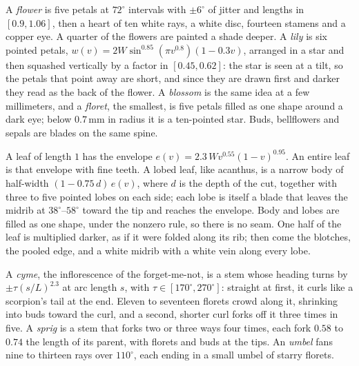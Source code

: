 \begin{construction}[Flowers]
  A \emph{flower} is five petals at $72^\circ$ intervals with
  $\pm6^\circ$ of jitter and lengths
  in $[0.9,1.06]$, then a heart of ten white rays, a white disc,
  fourteen stamens and a copper
  eye. A quarter of the flowers are painted a shade deeper. A
  \emph{lily} is six pointed
  petals, $w(v)=2W\sin^{0.85}(\pi v^{0.8})(1-0.3v)$, arranged in a
  star and then squashed
  vertically by a factor in $[0.45,0.62]$: the star is seen at a
  tilt, so the petals that point
  away are short, and since they are drawn first and darker they read
  as the back of the
  flower. A \emph{blossom} is the same idea at a few millimeters, and
  a \emph{floret}, the
  smallest, is five petals filled as one shape around a dark eye;
  below $0.7\,$mm in radius it is a
  ten-pointed star. Buds, bellflowers and sepals are blades on the same spine.
\end{construction}

\begin{construction}[Leaves]
  A leaf of length $1$ has the envelope $e(v)=2.3\,W
  v^{0.55}(1-v)^{0.95}$. An entire leaf is
  that envelope with fine teeth. A lobed leaf, like acanthus, is a
  narrow body of half-width
  $(1-0.75\,d)\,e(v)$, where $d$ is the depth of the cut, together
  with three to five pointed
  lobes on each side; each lobe is itself a blade that leaves the midrib at
  $38^\circ$--$58^\circ$ toward the tip and reaches the envelope.
  Body and lobes are filled as
  one shape, under the nonzero rule, so there is no seam. One half of
  the leaf is multiplied
  darker, as if it were folded along its rib; then come the blotches,
  the pooled edge, and a
  white midrib with a white vein along every lobe.
\end{construction}

\begin{construction}[Sprays]
  A \emph{cyme}, the inflorescence of the forget-me-not, is a stem
  whose heading turns by
  $\pm\tau(s/L)^{2.3}$ at arc length $s$, with
  $\tau\in[170^\circ,270^\circ]$: straight at first,
  it curls like a scorpion's tail at the end. Eleven to seventeen
  florets crowd along it,
  shrinking into buds toward the curl, and a second, shorter curl
  forks off it three times in
  five. A \emph{sprig} is a stem that forks two or three ways four
  times, each fork $0.58$ to
  $0.74$ the length of its parent, with florets and buds at the tips.
  An \emph{umbel} fans nine
  to thirteen rays over $110^\circ$, each ending in a small umbel of
  starry florets.
\end{construction}

